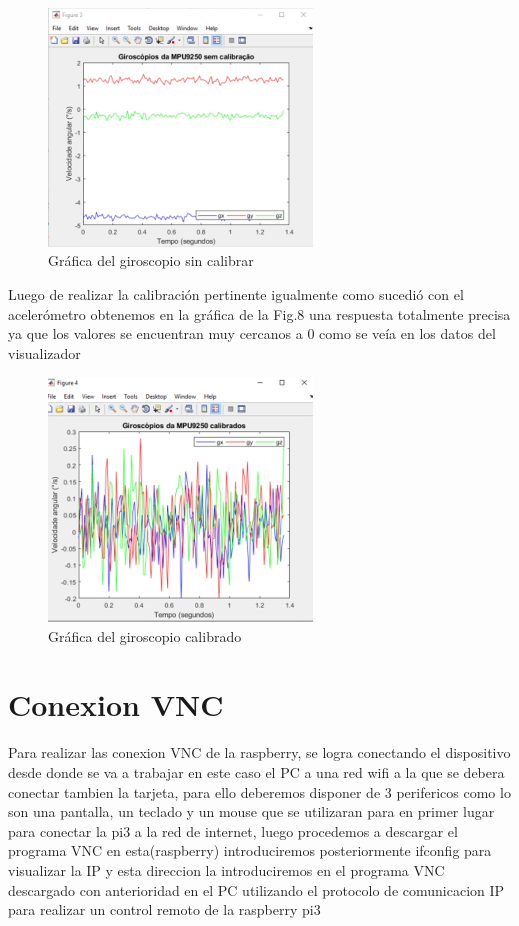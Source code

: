 \begin{figure}[htbp]
\centering
\includegraphics[width=7cm]{Figuras/giroscopio sin calibrar.jpeg}
\caption{Gráfica del giroscopio sin calibrar}
\label{fig:giroscopio sin calibrar}
\end{figure}
Luego de realizar la calibración pertinente igualmente como sucedió con el acelerómetro obtenemos en la gráfica de la Fig.8 una respuesta totalmente precisa ya que los valores se encuentran muy cercanos a 0 como se veía en los datos del visualizador
\begin{figure}[htbp]
\centering
\includegraphics[width=7cm]{Figuras/giroscopio calibrado.jpeg}
\caption{Gráfica del giroscopio calibrado}
\label{fig:giroscopio calibrado}
\end{figure}
\section{Conexion VNC} \label{sec:VNC}
Para realizar las conexion VNC de la raspberry, se logra conectando el dispositivo desde donde se va a trabajar en este caso el PC a una red wifi a la que se debera conectar tambien la tarjeta, para ello deberemos disponer de 3 perifericos como lo son una pantalla, un teclado y un mouse que se utilizaran para en primer lugar para conectar la pi3 a la red de internet, luego procedemos a descargar el programa VNC en esta(raspberry) introduciremos posteriormente ifconfig para visualizar la IP y esta direccion la introduciremos en el programa VNC descargado con anterioridad en el PC utilizando el protocolo de comunicacion IP para realizar un control remoto de la raspberry pi3
